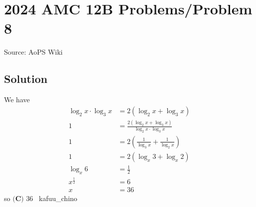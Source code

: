 \documentclass[12pt]{article}
\begin{document}
\section*{{2024 AMC 12B Problems/Problem 8}}
Source: AoPS Wiki

\subsection*{Solution}
We have
\begin{align*}
\log_2x\cdot\log_3x&=2(\log_2x+\log_3x) \\
1&=\frac{2(\log_2x+\log_3x)}{\log_2x\cdot\log_3x} \\
1&=2(\frac{1}{\log_3x}+\frac{1}{\log_2x}) \\
1&=2(\log_x3+\log_x2) \\
\log_x6&=\frac{1}{2} \\
x^{\frac{1}{2}}&=6 \\
x&=36
\end{align*}
so $\boxed{\textbf{(C) }36}$ ~kafuu_chino
\end{document}
